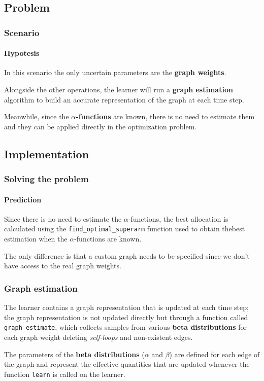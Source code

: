 
\subsection{Problem}


\begin{frame}

\frametitle{Scenario}
\framesubtitle{Hypotesis}

In this scenario the only uncertain parameters are the \textbf{graph weights}.

Alongside the other operations, the learner will run a \textbf{graph estimation} algorithm to build an accurate representation of the graph at each time step.

Meanwhile, since the \textbf{$\alpha$-functions} are known, there is no need to estimate them and they can be applied directly in the optimization problem.

\end{frame}


\subsection{Implementation}


\begin{frame}

\frametitle{Solving the problem}
\framesubtitle{Prediction}

Since there is no need to estimate the $\alpha$-functions, the best allocation is calculated using the \texttt{find\_optimal\_superarm} function used to obtain thebest estimation when the $\alpha$-functions are known.

The only difference is that a custom graph needs to be specified since we don't have access to the real graph weights.

\end{frame}


\begin{frame}

\frametitle{Graph estimation}

The learner contains a graph representation that is updated at each time step; the graph representation is not updated directly but through a function called \texttt{graph\_estimate}, which collects samples from various \textbf{beta distributions} for each graph weight deleting \textit{self-loops} and non-existent edges.

The parameters of the \textbf{beta distributions} ($\alpha$ and $\beta$) are defined for each edge of the graph and represent the effective quantities that are updated whenever the function \texttt{learn} is called on the learner.

\end{frame}

